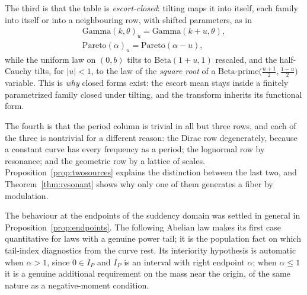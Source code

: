 \documentclass[sn-mathphys-num]{sn-jnl}
\theoremstyle{thmstyleone}%
\theoremstyle{thmstyletwo}%
\theoremstyle{thmstylethree}%
\theoremstyle{thmstyleone}%
\begin{document}
	
	The third is that the table is \emph{escort-closed}: tilting maps it
	into itself, each family into itself or into a neighbouring row, with
	shifted parameters, as in
	\begin{equation}\label{eq:escortclosed}
		\begin{gathered}
			\mathrm{Gamma}(k,\theta)_u=\mathrm{Gamma}(k+u,\theta),\\
			\mathrm{Pareto}(\alpha)_u=\mathrm{Pareto}(\alpha-u),
		\end{gathered}
	\end{equation}
	while the uniform law on $(0,b)$ tilts to $\mathrm{Beta}(1+u,1)$
	rescaled, and the half-Cauchy tilts, for $|u|<1$, to the law of the
	\emph{square root} of a
	$\mathrm{Beta\text{-}prime}\bigl(\tfrac{u+1}{2},
	\tfrac{1-u}{2}\bigr)$ variable. This is \emph{why} closed forms
	exist: the escort mean stays inside a finitely parametrized family
	closed under tilting, and the transform inherits its functional
	form.
	
	The fourth is that the period column is trivial in all but three rows,
	and each of the three is nontrivial for a different reason: the Dirac
	row degenerately, because a constant curve has every frequency as a
	period; the lognormal row by resonance; and the geometric row by a
	lattice of scales. Proposition~\ref{prop:twosources} explains the
	distinction between the last two, and
	Theorem~\ref{thm:resonant} shows why only one of them generates a
	fiber by modulation.
	
	The behaviour at the endpoints of the suddency domain was settled in
	general in Proposition~\ref{prop:endpoints}. The following Abelian
	law makes its first case quantitative for laws with a genuine power
	tail; it is the population fact on which tail-index diagnostics from
	the curve rest. Its interiority hypothesis is automatic when
	$\alpha>1$, since $0\in I_P$ and $I_P$ is an interval with right
	endpoint $\alpha$; when $\alpha\le1$ it is a genuine additional
	requirement on the mass near the origin, of the same nature as a
	negative-moment condition.
	
\end{document}
